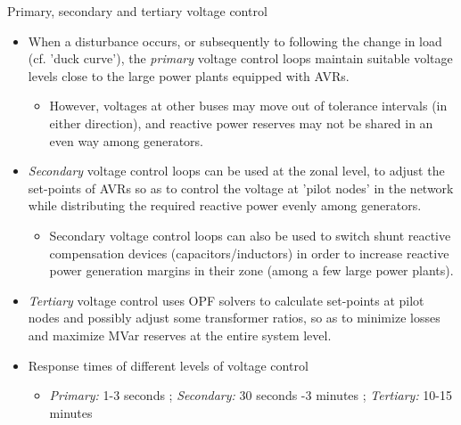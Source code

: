 \begin{frame}[allowframebreaks]{Primary, secondary and tertiary voltage control}
    \begin{itemize}
        \item When a disturbance occurs, or subsequently to following the change in load (cf. 'duck curve'), the \textit{primary} voltage control loops maintain suitable voltage levels close to the large power plants equipped with AVRs.
        \begin{itemize}
            \item However, voltages at other buses may move out of tolerance intervals (in either direction), and reactive power reserves may not be shared in an even way among generators.
        \end{itemize}
        \item \textit{Secondary} voltage control loops can be used at the zonal level, to adjust the set-points of AVRs so as to control the voltage at 'pilot nodes' in the network while distributing the required reactive power evenly among generators.
        \begin{itemize}
            \item Secondary voltage control loops can also be used to switch shunt reactive compensation devices (capacitors/inductors) in order to increase reactive power generation margins in their zone (among a few large power plants).
        \end{itemize}
        \item \textit{Tertiary} voltage control uses OPF solvers to calculate set-points at pilot nodes and possibly adjust some transformer ratios, so as to minimize losses and maximize MVar reserves at the entire system level.
        \item Response times of different levels of voltage control
        \begin{itemize}
            \item \textit{Primary:} 1-3 seconds ; \textit{Secondary:} 30 seconds -3 minutes ; \textit{Tertiary:} 10-15 minutes
        \end{itemize}
    \end{itemize}
\end{frame}






